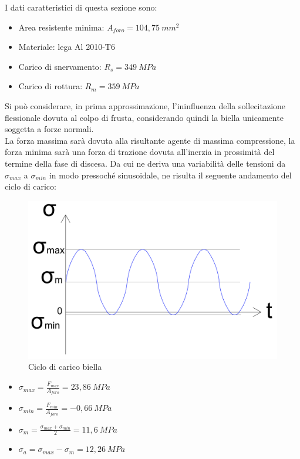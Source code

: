 I dati caratteristici di questa sezione sono:
\begin{itemize}
    \item Area resistente minima: $A_{foro}=104,75\ mm^2$
    \item Materiale: lega Al 2010-T6
    \item Carico di snervamento: $R_s=349\ MPa$
    \item Carico di rottura: $R_m=359\ MPa$
\end{itemize}
Si può considerare, in prima approssimazione, l'ininfluenza della sollecitazione flessionale dovuta al colpo di frusta, considerando quindi la biella unicamente soggetta a forze normali. \\
La forza massima sarà dovuta alla risultante agente di massima compressione, la forza minima sarà una forza di trazione dovuta all'inerzia in prossimità del termine della fase di discesa. 
Da cui ne deriva una variabilità delle tensioni da $\sigma_{max}$ a $\sigma_{min}$ in modo pressoché sinusoidale,
ne risulta il seguente andamento del ciclo di carico:
\begin{figure}[h]
    \centering
    \includegraphics[scale=0.27]{Immagini/CicloFaticaBiella.png}
    \caption{Ciclo di carico biella}
    \label{fig:CicloFaticaBiella}
\end{figure}
\begin{itemize}
    \item $\sigma_{max}=\frac{F_{max}}{A_{foro}}=23,86\ MPa$
    \item $\sigma_{min}=\frac{F_{min}}{A_{foro}}=-0,66\ MPa$
    \item $\sigma_m=\frac{\sigma_{max}+\sigma_{min}}{2}=11,6\ MPa$
    \item $\sigma_a=\sigma_{max}-\sigma_m=12,26\ MPa$
\end{itemize}

